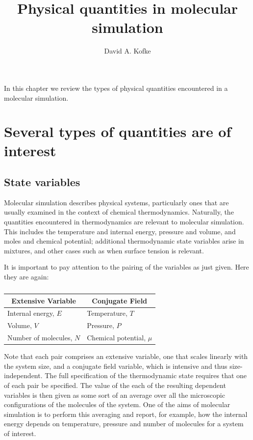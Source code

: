 \documentclass[9pt,bestpractices]{molsim}
\title{Physical quantities in molecular simulation}
\author[1*]{David A. Kofke}
\affil[1]{University at Buffalo}
\begin{document}
\maketitle

In this chapter we review the types of physical quantities encountered
in a molecular simulation.

\section{Several types of quantities are of interest}
\subsection{State variables}\label{state-variables}

Molecular simulation describes physical systems, particularly ones that
are usually examined in the context of chemical thermodynamics.
Naturally, the quantities encountered in thermodynamics are relevant to
molecular simulation. This includes the temperature and internal energy,
pressure and volume, and moles and chemical potential; additional
thermodynamic state variables arise in mixtures, and other cases such as
when surface tension is relevant.

It is important to pay attention to the pairing of the variables as just
given. Here they are again:
\begin{table}[h]
  \centering
  \caption*{}
  \label{my-label}
  \begin{tabular}{ll}
    \hline
  \hline
  \multicolumn{1}{c}{\textbf{Extensive Variable}} & \multicolumn{1}{c}{\textbf{Conjugate Field}} \\ \hline
  Internal energy, $E$                            & Temperature, $T$                             \\
  Volume, $V$                                     & Pressure, $P$                                \\
  Number of molecules, $N$                        & Chemical potential, $\mu$                    \\ \hline
  \end{tabular}
  \end{table}

Note that each pair comprises an extensive variable, one that scales
linearly with the system size, and a conjugate field variable, which is
intensive and thus size-independent. The full specification of the
thermodynamic state requires that one of each pair be specified. The
value of the each of the resulting dependent variables is then given as
some sort of an average over all the microscopic configurations of the
molecules of the system. One of the aims of molecular simulation is to
perform this averaging and report, for example, how the internal energy
depends on temperature, pressure and number of molecules for a system of
interest.
\end{document}
